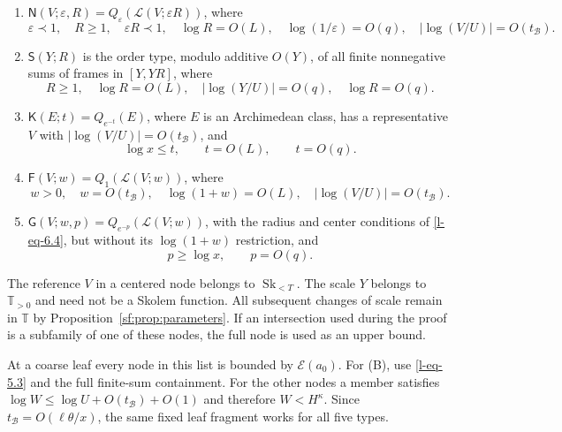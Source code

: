 \documentclass[11pt]{article}
\theoremstyle{definition}
\theoremstyle{remark}
\newcommand{\Sk}{\operatorname{Sk}}
\newcommand{\T}{\mathbb T}
\newcommand{\EE}{\mathcal E}
\newcommand{\NN}{\mathsf N}
\newcommand{\SSS}{\mathsf S}
\newcommand{\KK}{\mathsf K}
\newcommand{\FF}{\mathsf F}
\newcommand{\GG}{\mathsf G}
\newcommand{\calB}{\mathcal B}
\newcommand{\calL}{\mathcal L}
\numberwithin{equation}{section}
\begin{document}
\begin{enumerate}[label=\textup{(\Alph*)},leftmargin=3em]
\item $\NN(V;\varepsilon,R)=Q_\varepsilon(\calL(V;\varepsilon R))$,
where
\begin{equation}
 \varepsilon\prec1,\quad R\ge1,\quad\varepsilon R\prec1,\quad
 \log R=O(L),\quad \log(1/\varepsilon)=O(q),\quad
 |\log(V/U)|=O(t_{\calB}).
 \label{l-eq-6.1}
\end{equation}
\item $\SSS(Y;R)$ is the order type, modulo additive $O(Y)$,
of all finite nonnegative sums of frames in $[Y,YR]$, where
\begin{equation}
 R\ge1,\quad \log R=O(L),\quad
 |\log(Y/U)|=O(q),\quad \log R=O(q).
 \label{l-eq-6.2}
\end{equation}
\item $\KK(E;t)=Q_{e^{-t}}(E)$, where $E$ is an Archimedean class,
has a representative $V$ with $|\log(V/U)|=O(t_{\calB})$, and
\begin{equation}
 \log x\le t,\qquad t=O(L),\qquad t=O(q).
 \label{l-eq-6.3}
\end{equation}
\item $\FF(V;w)=Q_1(\calL(V;w))$, where
\begin{equation}
 w>0,\quad w=O(t_{\calB}),\quad \log(1+w)=O(L),\quad
 |\log(V/U)|=O(t_{\calB}).
 \label{l-eq-6.4}
\end{equation}
\item $\GG(V;w,p)=Q_{e^{-p}}(\calL(V;w))$, with the radius and center conditions of \eqref{l-eq-6.4}, but without
its $\log(1+w)$ restriction, and
\begin{equation}
 p\ge\log x,\qquad p=O(q).
 \label{l-eq-6.5}
\end{equation}
\end{enumerate}
The reference $V$ in a centered node belongs to $\Sk_{<T}$.
The scale $Y$ belongs to $\T_{>0}$ and need not be a Skolem function.
All subsequent changes of scale remain in $\T$ by
Proposition~\ref{sf:prop:parameters}.
If an intersection used during the proof is a subfamily of one of
these nodes, the full node is used as an upper bound.

At a coarse leaf every node in this list is bounded by $\EE(a_0)$.
For (B), use \eqref{l-eq-5.3} and the full finite-sum containment.
For the other nodes a member satisfies
$\log W\le\log U+O(t_{\calB})+O(1)$ and therefore
$W<H^\kappa$.  Since $t_{\calB}=O(\ell\theta/x)$,
the same fixed leaf fragment works for all five types.
\end{document}

